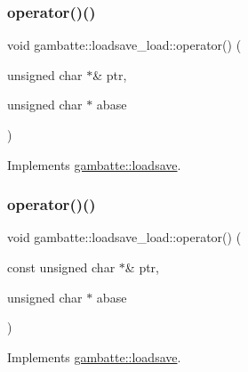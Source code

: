 \subsubsection{\texorpdfstring{operator()()}{operator()()}\hspace{0.1cm}{\footnotesize\ttfamily [18/19]}}
{\footnotesize\ttfamily void gambatte\+::loadsave\+\_\+load\+::operator() (\begin{DoxyParamCaption}\item[{unsigned char $\ast$\&}]{ptr,  }\item[{unsigned char $\ast$}]{abase }\end{DoxyParamCaption})\hspace{0.3cm}{\ttfamily [virtual]}}



Implements \hyperlink{classgambatte_1_1loadsave_a911a5ce78fbb8c4ceb36984a9967ea72}{gambatte\+::loadsave}.

\mbox{\label{classgambatte_1_1loadsave__load_a58313e7e62236560888348cf8e779cb0}} 
\subsubsection{\texorpdfstring{operator()()}{operator()()}\hspace{0.1cm}{\footnotesize\ttfamily [19/19]}}
{\footnotesize\ttfamily void gambatte\+::loadsave\+\_\+load\+::operator() (\begin{DoxyParamCaption}\item[{const unsigned char $\ast$\&}]{ptr,  }\item[{unsigned char $\ast$}]{abase }\end{DoxyParamCaption})\hspace{0.3cm}{\ttfamily [virtual]}}



Implements \hyperlink{classgambatte_1_1loadsave_a57518c27d7844ae48faea91fc04a680a}{gambatte\+::loadsave}.

\mbox{\label{classgambatte_1_1loadsave__load_a2ac8e306cef4eab6a804deab9e853fd3}} 
